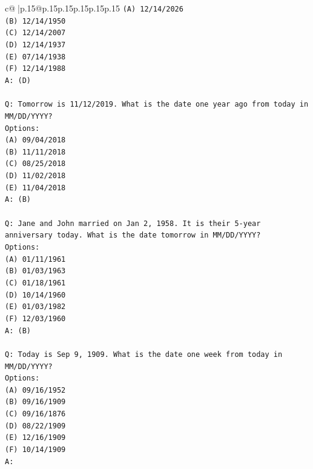\documentclass{article}
\begin{document}
{\begin{supertabular}{c@{$\;$}|p{.15\linewidth}@{}p{.15\linewidth}p{.15\linewidth}p{.15\linewidth}p{.15\linewidth}p{.15\linewidth}}
{{{\texttt{(A) 12/14/2026} \\
\texttt{(B) 12/14/1950} \\
\texttt{(C) 12/14/2007} \\
\texttt{(D) 12/14/1937} \\
\texttt{(E) 07/14/1938} \\
\texttt{(F) 12/14/1988} \\
\texttt{A: (D)} \\
\\ 
\texttt{Q: Tomorrow is 11/12/2019. What is the date one year ago from today in MM/DD/YYYY?} \\
\texttt{Options:} \\
\texttt{(A) 09/04/2018} \\
\texttt{(B) 11/11/2018} \\
\texttt{(C) 08/25/2018} \\
\texttt{(D) 11/02/2018} \\
\texttt{(E) 11/04/2018} \\
\texttt{A: (B)} \\
\\ 
\texttt{Q: Jane and John married on Jan 2, 1958. It is their 5{-}year anniversary today. What is the date tomorrow in MM/DD/YYYY?} \\
\texttt{Options:} \\
\texttt{(A) 01/11/1961} \\
\texttt{(B) 01/03/1963} \\
\texttt{(C) 01/18/1961} \\
\texttt{(D) 10/14/1960} \\
\texttt{(E) 01/03/1982} \\
\texttt{(F) 12/03/1960} \\
\texttt{A: (B)} \\
\\ 
\texttt{Q: Today is Sep 9, 1909. What is the date one week from today in MM/DD/YYYY?} \\
\texttt{Options:} \\
\texttt{(A) 09/16/1952} \\
\texttt{(B) 09/16/1909} \\
\texttt{(C) 09/16/1876} \\
\texttt{(D) 08/22/1909} \\
\texttt{(E) 12/16/1909} \\
\texttt{(F) 10/14/1909} \\
\texttt{A:} \\
            }
        }
    }
     \\ \\


\end{supertabular}}
\end{document}
